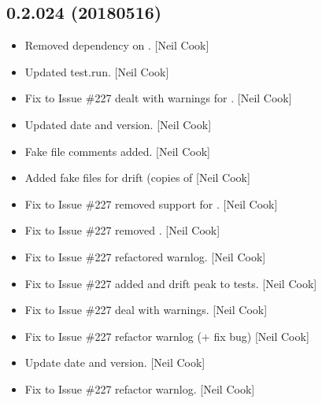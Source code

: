 \documentclass[a4paper,10pt,english]{report}
\begin{document}
\subsection{0.2.024 (2018\sphinxhyphen{}05\sphinxhyphen{}16)}
\label{\detokenize{misc/changelog:id456}}\begin{itemize}
\item {} 
Removed dependency on . {[}Neil Cook{]}

\item {} 
Updated test.run. {[}Neil Cook{]}

\item {} 
Fix to Issue \#227 \sphinxhyphen{} dealt with warnings for . {[}Neil Cook{]}

\item {} 
Updated date and version. {[}Neil Cook{]}

\item {} 
Fake file comments added. {[}Neil Cook{]}

\item {} 
Added fake  files for drift (copies of  {[}Neil Cook{]}

\item {} 
Fix to Issue \#227 \sphinxhyphen{} removed support for . {[}Neil
Cook{]}

\item {} 
Fix to Issue \#227 \sphinxhyphen{} removed . {[}Neil Cook{]}

\item {} 
Fix to Issue \#227 \sphinxhyphen{} refactored warnlog. {[}Neil Cook{]}

\item {} 
Fix to Issue \#227 \sphinxhyphen{} added  and drift peak to tests. {[}Neil
Cook{]}

\item {} 
Fix to Issue \#227 \sphinxhyphen{} deal with warnings. {[}Neil Cook{]}

\item {} 
Fix to Issue \#227 \sphinxhyphen{} refactor warnlog (+ fix bug) {[}Neil Cook{]}

\item {} 
Update date and version. {[}Neil Cook{]}

\item {} 
Fix to Issue \#227 \sphinxhyphen{} refactor warnlog. {[}Neil Cook{]}


\end{itemize}
\end{document}
